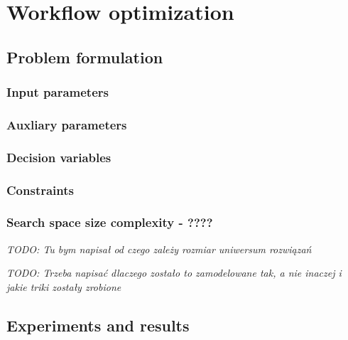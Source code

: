 \chapter{Workflow optimization}
\label{chap:formulation-workflows} 

\section{Problem formulation}

\subsection{Input parameters}

\subsection{Auxliary parameters}

\subsection{Decision variables}

\subsection{Constraints}

\subsection{Search space size complexity - ????}

\emph{TODO: Tu bym napisał od czego zależy rozmiar uniwersum rozwiązań}

\emph{TODO: Trzeba napisać dlaczego zostało to zamodelowane tak, a nie inaczej i jakie triki zostały zrobione}

\section{Experiments and results}
